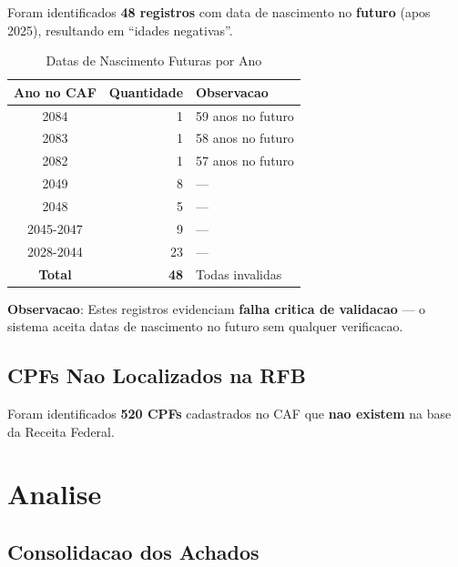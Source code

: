 \documentclass[11pt,a4paper]{article}
\begin{document}
Foram identificados \textbf{48 registros} com data de nascimento no \textbf{futuro}
(apos 2025), resultando em ``idades negativas''.

\begin{table}[H]
\centering
\caption{Datas de Nascimento Futuras por Ano}
\label{tab:futuras}
\begin{tabular}{crl}
\toprule
\textbf{Ano no CAF} & \textbf{Quantidade} & \textbf{Observacao} \\
\midrule
2084 & 1 & 59 anos no futuro \\
2083 & 1 & 58 anos no futuro \\
2082 & 1 & 57 anos no futuro \\
2049 & 8 & --- \\
2048 & 5 & --- \\
2045-2047 & 9 & --- \\
2028-2044 & 23 & --- \\
\midrule
\textbf{Total} & \textbf{48} & Todas invalidas \\
\bottomrule
\end{tabular}
\end{table}

\textbf{Observacao}: Estes registros evidenciam \textbf{falha critica de validacao} ---
o sistema aceita datas de nascimento no futuro sem qualquer verificacao.


\subsection{CPFs Nao Localizados na RFB}

Foram identificados \textbf{520 CPFs} cadastrados no CAF que \textbf{nao existem}
na base da Receita Federal.

\section{Analise}

\subsection{Consolidacao dos Achados}
\end{document}
